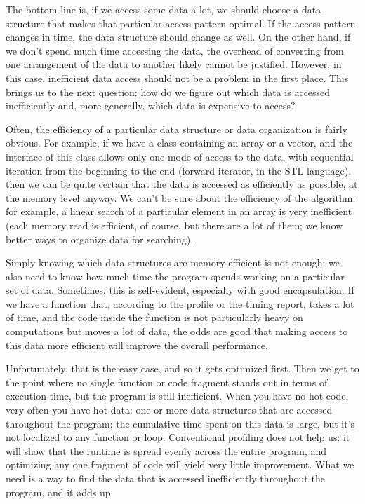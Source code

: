 The bottom line is, if we access some data a lot, we should choose a data structure that makes that particular access pattern optimal. If the access pattern changes in time, the data structure should change as well. On the other hand, if we don't spend much time accessing the data, the overhead of converting from one arrangement of the data to another likely cannot be justified. However, in this case, inefficient data access should not be a problem in the first place. This brings us to the next question: how do we figure out which data is accessed inefficiently and, more generally, which data is expensive to access?


Often, the efficiency of a particular data structure or data organization is fairly obvious. For example, if we have a class containing an array or a vector, and the interface of this class allows only one mode of access to the data, with sequential iteration from the beginning to the end (forward iterator, in the STL language), then we can be quite certain that the data is accessed as efficiently as possible, at the memory level anyway. We can't be sure about the efficiency of the algorithm: for example, a linear search of a particular element in an array is very inefficient (each memory read is efficient, of course, but there are a lot of them; we know better ways to organize data for searching).

Simply knowing which data structures are memory-efficient is not enough: we also need to know how much time the program spends working on a particular set of data. Sometimes, this is self-evident, especially with good encapsulation. If we have a function that, according to the profile or the timing report, takes a lot of time, and the code inside the function is not particularly heavy on computations but moves a lot of data, the odds are good that making access to this data more efficient will improve the overall performance.

Unfortunately, that is the easy case, and so it gets optimized first. Then we get to the point where no single function or code fragment stands out in terms of execution time, but the program is still inefficient. When you have no hot code, very often you have hot data: one or more data structures that are accessed throughout the program; the cumulative time spent on this data is large, but it's not localized to any function or loop. Conventional profiling does not help us: it will show that the runtime is spread evenly across the entire program, and optimizing any one fragment of code will yield very little improvement. What we need is a way to find the data that is accessed inefficiently throughout the program, and it adds up.

